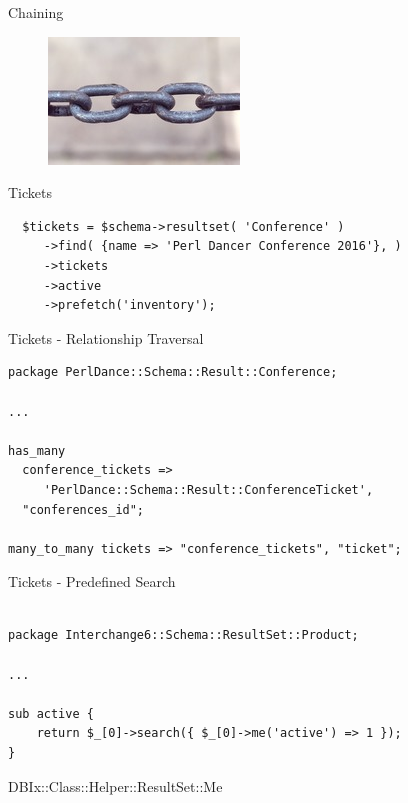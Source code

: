\begin{frame}{Chaining}
  \begin{figure}[!ht]
    \begin{center}
      \includegraphics{img/chains.jpg}
    \end{center}
  \end{figure}
\end{frame}

\begin{frame}[fragile]{Tickets}

\begin{lstlisting}
  $tickets = $schema->resultset( 'Conference' )
     ->find( {name => 'Perl Dancer Conference 2016'}, )
     ->tickets
     ->active
     ->prefetch('inventory');
\end{lstlisting}
\end{frame}

\begin{frame}[fragile]{Tickets - Relationship Traversal}
\begin{lstlisting}
package PerlDance::Schema::Result::Conference;

...

has_many
  conference_tickets =>
     'PerlDance::Schema::Result::ConferenceTicket',
  "conferences_id";

many_to_many tickets => "conference_tickets", "ticket";

\end{lstlisting}
\end{frame}

\begin{frame}[fragile]{Tickets - Predefined Search}
\begin{lstlisting}

package Interchange6::Schema::ResultSet::Product;

...

sub active {
    return $_[0]->search({ $_[0]->me('active') => 1 });
}

\end{lstlisting}

DBIx::Class::Helper::ResultSet::Me

\end{frame}

